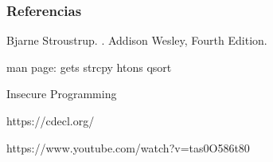 \begin{frame}[allowframebreaks]
   \frametitle<presentation>{Referencias}

   \begin{thebibliography}{10}

         \beamertemplatebookbibitems

         Bjarne Stroustrup.
         .
         \newblock Addison Wesley, Fourth Edition.

         \beamertemplatearticlebibitems

         man page: gets strcpy htons qsort

         Insecure Programming

          https://cdecl.org/

          https://www.youtube.com/watch?v=tas0O586t80


   \end{thebibliography}
\end{frame}




